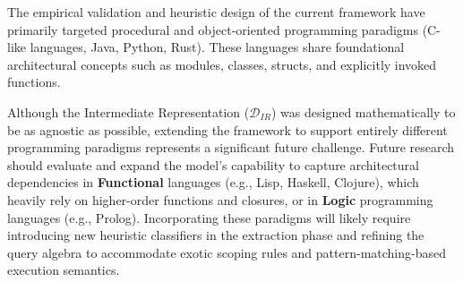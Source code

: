 The empirical validation and heuristic design of the current
framework have primarily targeted procedural and object-oriented
programming paradigms (C-like languages, Java, Python, Rust). These
languages share foundational architectural concepts such as modules,
classes, structs, and explicitly invoked functions.

Although the Intermediate Representation ($\mathcal{D}_{IR}$) was
designed mathematically to be as agnostic as possible, extending the
framework to support entirely different programming paradigms
represents a significant future challenge. Future research should
evaluate and expand the model's capability to capture architectural
dependencies in \textbf{Functional} languages (e.g., Lisp, Haskell,
Clojure), which heavily rely on higher-order functions and closures,
or in \textbf{Logic} programming languages (e.g., Prolog).
Incorporating these paradigms will likely require introducing new
heuristic classifiers in the extraction phase and refining the query
algebra to accommodate exotic scoping rules and
pattern-matching-based execution semantics.
